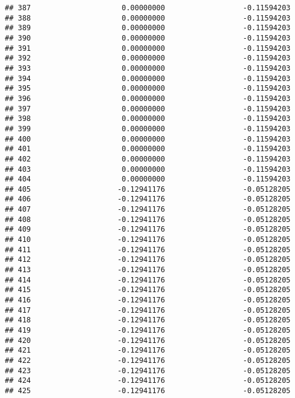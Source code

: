 \documentclass[]{article}
\begin{document}
\begin{verbatim}
## 387                     0.00000000                  -0.11594203
## 388                     0.00000000                  -0.11594203
## 389                     0.00000000                  -0.11594203
## 390                     0.00000000                  -0.11594203
## 391                     0.00000000                  -0.11594203
## 392                     0.00000000                  -0.11594203
## 393                     0.00000000                  -0.11594203
## 394                     0.00000000                  -0.11594203
## 395                     0.00000000                  -0.11594203
## 396                     0.00000000                  -0.11594203
## 397                     0.00000000                  -0.11594203
## 398                     0.00000000                  -0.11594203
## 399                     0.00000000                  -0.11594203
## 400                     0.00000000                  -0.11594203
## 401                     0.00000000                  -0.11594203
## 402                     0.00000000                  -0.11594203
## 403                     0.00000000                  -0.11594203
## 404                     0.00000000                  -0.11594203
## 405                    -0.12941176                  -0.05128205
## 406                    -0.12941176                  -0.05128205
## 407                    -0.12941176                  -0.05128205
## 408                    -0.12941176                  -0.05128205
## 409                    -0.12941176                  -0.05128205
## 410                    -0.12941176                  -0.05128205
## 411                    -0.12941176                  -0.05128205
## 412                    -0.12941176                  -0.05128205
## 413                    -0.12941176                  -0.05128205
## 414                    -0.12941176                  -0.05128205
## 415                    -0.12941176                  -0.05128205
## 416                    -0.12941176                  -0.05128205
## 417                    -0.12941176                  -0.05128205
## 418                    -0.12941176                  -0.05128205
## 419                    -0.12941176                  -0.05128205
## 420                    -0.12941176                  -0.05128205
## 421                    -0.12941176                  -0.05128205
## 422                    -0.12941176                  -0.05128205
## 423                    -0.12941176                  -0.05128205
## 424                    -0.12941176                  -0.05128205
## 425                    -0.12941176                  -0.05128205

\end{verbatim}
\end{document}
